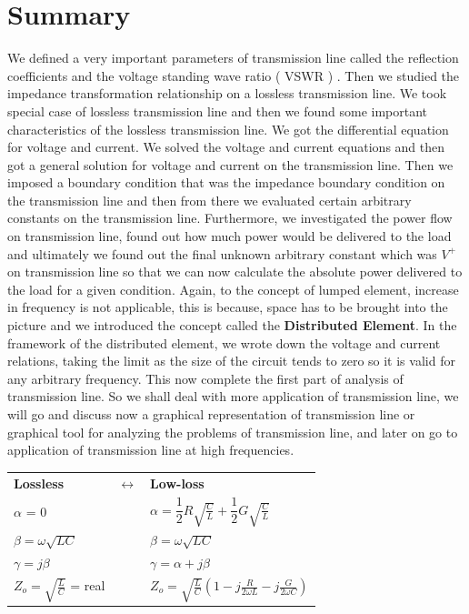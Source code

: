 \section{Summary}  
We defined a very important parameters of transmission line called the reflection coefficients and the voltage standing wave ratio ( VSWR ) . Then we studied the impedance transformation relationship on a lossless transmission line. We took special case of lossless transmission line and then we found some important characteristics of the lossless transmission line. We got the differential equation for voltage and current. We solved the voltage and current equations and then got a general solution for voltage and current on the transmission line. Then we imposed a boundary condition that was the impedance boundary condition on the transmission line and then from there we evaluated certain arbitrary constants on the transmission line. Furthermore, we investigated the power flow on transmission line, found out how much power would be delivered to the load and ultimately we found out the final unknown arbitrary constant which was $V^+$ on transmission line so that we can now calculate the absolute power delivered to the load for a given condition. Again, to the concept of lumped element, increase in frequency is not applicable,  this is because, space has to be brought into the picture and we introduced the concept called the \textbf{Distributed Element}. In the framework of the distributed element, we wrote down the voltage and current relations, taking the limit as the size of the circuit tends to zero so it is valid for any arbitrary frequency. This now complete the first part of analysis of transmission line. So we shall deal with more application of transmission line, we will go and discuss now a graphical representation of transmission line or graphical tool for analyzing the problems of transmission line, and later on go to application of transmission line at high frequencies. 

\begin{tabular}{l c l}
{\bf Lossless}&   	$\leftrightarrow$  & {\bf Low-loss}  \\ 
$\alpha$ = 0 &  & $\alpha = \dfrac{1}{2}R\sqrt{\frac{C}{L}} + \dfrac{1}{2}G\sqrt{\frac{C}{L}}$  \\
$\beta = \omega\sqrt{LC}$ & & $\beta = \omega\sqrt{LC}$\\
$\gamma = j\beta$ & & $\gamma = \alpha + j\beta$\\
$Z_o = \sqrt{\frac{L}{C}}$ = real &  & 	$Z_o = \sqrt{\frac{L}{C}}\left(1 - j\frac{R}{2\omega L} - j\frac{G}{2\omega C}\right)$
\end{tabular} 

